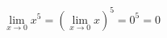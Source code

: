\begin{ex}
\begin{align}
&\lim_{x\rightarrow 0} x^5=(\lim_{x\rightarrow 0} x)^5=0^5=0\nonumber
\end{align}
\end{ex}